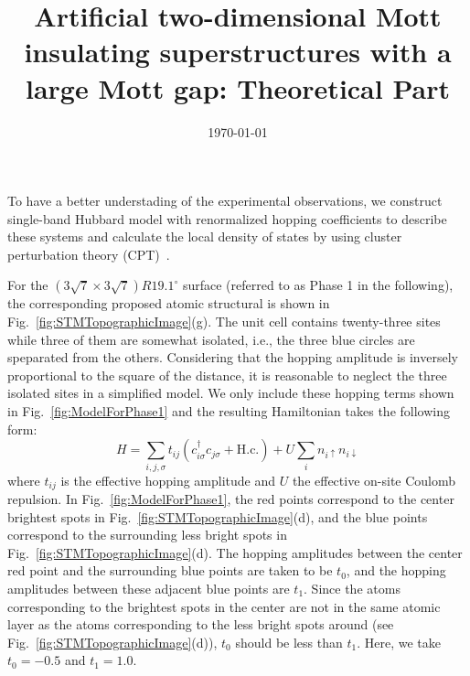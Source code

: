 \documentclass[aps,prb,amsfonts,amsmath,amssymb,showpacs,groupedaddress,superscriptaddress]{revtex4-1}
\begin{document}
\title{Artificial two-dimensional Mott insulating superstructures with a large Mott gap: Theoretical Part}

\date{\today}

\maketitle

To have a better understading of the experimental observations, we construct single-band Hubbard model with renormalized hopping coefficients to describe these systems and calculate the local density of states by using cluster perturbation theory (CPT)~\cite{PhysRevB.48.418,PhysRevLett.84.522}.

For the $(3\sqrt{7} \times 3\sqrt{7})R19.1^\circ$ surface (referred to as Phase 1 in the following), the corresponding proposed atomic structural is shown in Fig.~\ref{fig:STMTopographicImage}(g). The unit cell contains twenty-three sites while three of them are somewhat isolated, i.e., the three blue circles are speparated from the others. Considering that the hopping amplitude is inversely proportional to the square of the distance, it is reasonable to neglect the three isolated sites in a simplified model. We only include these hopping terms shown in Fig.~\ref{fig:ModelForPhase1} and the resulting Hamiltonian takes the following form:
\begin{equation}
    H = \sum_{i,j,\sigma} t_{ij}(c_{i\sigma}^{\dagger}c_{j\sigma} + \text{H.c.}) + U \sum_{i} n_{i\uparrow} n_{i\downarrow}
    \label{eq:ModelHamiltonian}
\end{equation}
where $t_{ij}$ is the effective hopping amplitude and $U$ the effective on-site Coulomb repulsion. In Fig.~\ref{fig:ModelForPhase1}, the red points correspond to the center brightest spots in Fig.~\ref{fig:STMTopographicImage}(d), and the blue points correspond to the surrounding less bright spots in Fig.~\ref{fig:STMTopographicImage}(d). The hopping amplitudes between the center red point and the surrounding blue points are taken to be $t_0$, and the hopping amplitudes between these adjacent blue points are $t_1$.
Since the atoms corresponding to the brightest spots in the center are not in the same atomic layer as the atoms corresponding to the less bright spots around (see Fig.~\ref{fig:STMTopographicImage}(d)), $t_0$ should be less than $t_1$. Here, we take $t_0 = -0.5$ and $t_1 = 1.0$.
\end{document}
